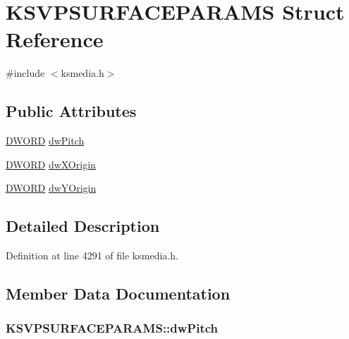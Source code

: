\hypertarget{struct_k_s_v_p_s_u_r_f_a_c_e_p_a_r_a_m_s}{}\section{K\+S\+V\+P\+S\+U\+R\+F\+A\+C\+E\+P\+A\+R\+A\+MS Struct Reference}
\label{struct_k_s_v_p_s_u_r_f_a_c_e_p_a_r_a_m_s}


{\ttfamily \#include $<$ksmedia.\+h$>$}

\subsection*{Public Attributes}
\begin{DoxyCompactItemize}
\item 
\hyperlink{mapinls_8h_ad342ac907eb044443153a22f964bf0af}{D\+W\+O\+RD} \hyperlink{struct_k_s_v_p_s_u_r_f_a_c_e_p_a_r_a_m_s_ac4939284f528aef122e6a9f2d5a55dd8}{dw\+Pitch}
\item 
\hyperlink{mapinls_8h_ad342ac907eb044443153a22f964bf0af}{D\+W\+O\+RD} \hyperlink{struct_k_s_v_p_s_u_r_f_a_c_e_p_a_r_a_m_s_ad99b73793f1390860f2f2b749235704e}{dw\+X\+Origin}
\item 
\hyperlink{mapinls_8h_ad342ac907eb044443153a22f964bf0af}{D\+W\+O\+RD} \hyperlink{struct_k_s_v_p_s_u_r_f_a_c_e_p_a_r_a_m_s_a8c9c96fe694fdea9da6249e6e76d4e5b}{dw\+Y\+Origin}
\end{DoxyCompactItemize}


\subsection{Detailed Description}


Definition at line 4291 of file ksmedia.\+h.



\subsection{Member Data Documentation}
\subsubsection[{\texorpdfstring{dw\+Pitch}{dwPitch}}]{ K\+S\+V\+P\+S\+U\+R\+F\+A\+C\+E\+P\+A\+R\+A\+M\+S\+::dw\+Pitch}\hypertarget{struct_k_s_v_p_s_u_r_f_a_c_e_p_a_r_a_m_s_ac4939284f528aef122e6a9f2d5a55dd8}{}\label{struct_k_s_v_p_s_u_r_f_a_c_e_p_a_r_a_m_s_ac4939284f528aef122e6a9f2d5a55dd8}


